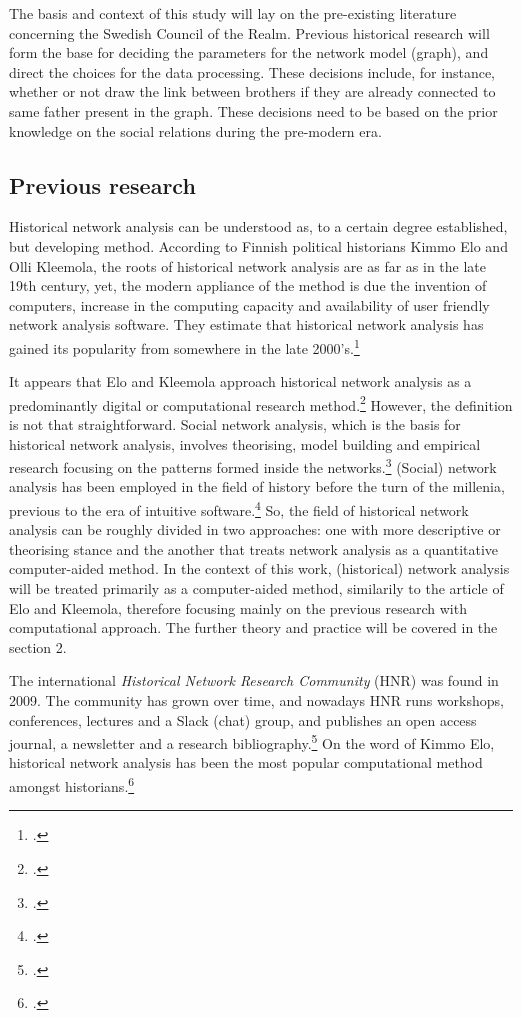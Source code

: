 \documentclass[a4paper,12pt]{article}
\begin{document}
\begin{onehalfspace}
The basis and context of this study will lay on the pre-existing literature concerning the Swedish Council of the Realm. Previous historical research will form the base for deciding the parameters for the network model (graph), and direct the choices for the data processing. These decisions include, for instance, whether or not draw the link between brothers if they are already connected to same father present in the graph. These decisions need to be based on the prior knowledge on the social relations during the pre-modern era. 

\subsection{Previous research}
Historical network analysis can be understood as, to a certain degree established, but developing method. According to Finnish political historians Kimmo Elo and Olli Kleemola, the roots of historical network analysis are as far as in the late 19th century, yet, the modern appliance of the method is due the invention of computers, increase in the computing capacity and availability of user friendly network analysis software. They estimate that historical network analysis has gained its popularity from somewhere in the late 2000's.\footcite[p. 415-417.]{eloAklee15} 

It appears that Elo and Kleemola approach historical network analysis as a predominantly digital or computational research method.\footcite[p. 415-417.]{eloAklee15} However, the definition is not that straightforward. Social network analysis, which is the basis for historical network analysis, involves theorising, model building and empirical research focusing on the patterns formed inside the networks.\footcite[p. 22-24.]{Keats-R2007} (Social) network analysis has been employed in the field of history before the turn of the millenia, previous to the era of intuitive software.\footcite[TODO check!]{AronssonEtA1999} So, the field of historical network analysis can be roughly divided in two approaches: one with more descriptive or theorising stance and the another that treats network analysis as a quantitative computer-aided method. In the context of this work, (historical) network analysis will be treated primarily as a computer-aided method, similarily to the article of Elo and Kleemola, therefore focusing mainly on the previous research with computational approach. The further theory and practice will be covered in the section 2.

The international \textit{Historical Network Research Community} (HNR) was found in 2009. The community has grown over time, and nowadays HNR runs workshops, conferences, lectures and a Slack (chat) group, and publishes an open access journal, a newsletter and a research bibliography.\footcite{hnr} On the word of Kimmo Elo, historical network analysis has been the most popular computational method amongst historians.\footcite[p. 22.]{elo16} 


\end{onehalfspace}
\end{document}
